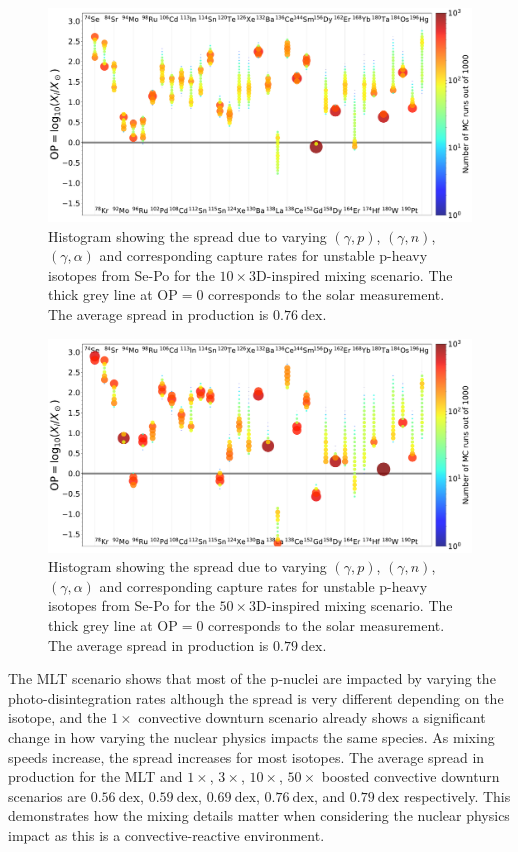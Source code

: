 \begin{figure}[!htbp]
\includegraphics[width=\textwidth]{chapters/2/figures/nuclearimpact_10x3D.pdf}
\caption{Histogram showing the spread due to varying $(\gamma,p)$, $(\gamma,n)$, $(\gamma,\alpha)$ and corresponding capture rates for unstable p-heavy isotopes from Se-Po for the $10\times$3D-inspired mixing scenario. The thick grey line at $\mathrm{OP} = 0$ corresponds to the solar measurement. The average spread in production is $0.76~\mathrm{dex}$.
\label{fig:nuclearimpact_10x3D}}
\end{figure}

\begin{figure}[!htbp]
\includegraphics[width=\textwidth]{chapters/2/figures/nuclearimpact_50x3D.pdf}
\caption{Histogram showing the spread due to varying $(\gamma,p)$, $(\gamma,n)$, $(\gamma,\alpha)$ and corresponding capture rates for unstable p-heavy isotopes from Se-Po for the $50\times$3D-inspired mixing scenario. The thick grey line at $\mathrm{OP} = 0$ corresponds to the solar measurement. The average spread in production is $0.79~\mathrm{dex}$.
\label{fig:nuclearimpact_50x3D}}
\end{figure}

The MLT scenario shows that most of the p-nuclei are impacted by varying the photo-disintegration rates although the spread is very different depending on the isotope, and the $1\times$ convective downturn scenario already shows a significant change in how varying the nuclear physics impacts the same species.
As mixing speeds increase, the spread increases for most isotopes.
The average spread in production for the MLT and $1\times$, $3\times$, $10\times$, $50\times$ boosted convective downturn scenarios are $0.56 ~\mathrm{dex}$, $0.59 ~\mathrm{dex}$, $0.69 ~\mathrm{dex}$, $0.76 ~\mathrm{dex}$, and $0.79 ~\mathrm{dex}$ respectively.
This demonstrates how the mixing details matter when considering the nuclear physics impact as this is a convective-reactive environment.

